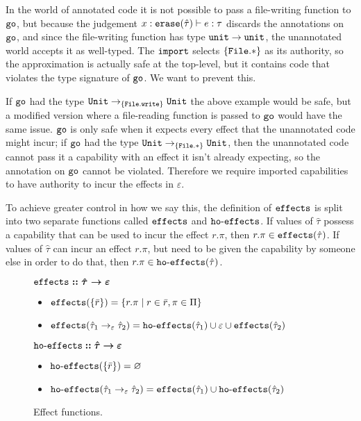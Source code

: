 In the world of annotated code it is not possible to pass a file-writing function to $\mathtt{go}$, but because the judgement $x: \mathtt{erase}(\hat \tau) \vdash e: \tau$ discards the annotations on $\mathtt{go}$, and since the file-writing function has type $\mathtt{unit} \rightarrow \mathtt{unit}$, the unannotated world accepts it as well-typed. The $\mathtt{import}$ selects $\{ \mathtt{File.*} \}$ as its authority, so the approximation is actually safe at the top-level, but it contains code that violates the type signature of $\mathtt{go}$. We want to prevent this.

If $\mathtt{go}$ had the type $\mathtt{Unit} \rightarrow_{\{ \mathtt{File.write} \}} \mathtt{Unit}$ the above example would be safe, but a modified version where a file-reading function is passed to $\mathtt{go}$ would have the same issue. $\mathtt{go}$ is only safe when it expects every effect that the unannotated code might incur; if $\mathtt{go}$ had the type $\mathtt{Unit} \rightarrow_{\{ \mathtt{File.*} \}} \mathtt{Unit}$, then the unannotated code cannot pass it a capability with an effect it isn't already expecting, so the annotation on $\mathtt{go}$ cannot be violated. Therefore we require imported capabilities to have authority to incur the effects in $\varepsilon$.

To achieve greater control in how we say this, the definition of $\mathtt{effects}$ is split into two separate functions called $\mathtt{effects}$ and $\mathtt{ho \hbox{-} effects}$. If values of $\hat \tau$ possess a capability that can be used to incur the effect $r.\pi$, then $r.\pi \in \mathtt{effects}(\hat \tau)$. If values of $\hat \tau$ can incur an effect $r.\pi$, but need to be given the capability by someone else in order to do that, then $r.\pi \in \mathtt{ho \hbox{-} effects}(\hat \tau)$.


\begin{figure}[h]

$\bm{\mathtt{effects :: \hat \tau \rightarrow \varepsilon}}$ \begin{itemize}
	\setlength\itemsep{-0.7em}
	\item[] $\mathtt{effects}(\{ \bar r \}) = \{ r.\pi \mid r \in \bar r, \pi \in \Pi \}$
	\item[] $\mathtt{effects}(\hat \tau_1 \rightarrow_{\varepsilon} \hat \tau_2) = \mathtt{ho \hbox{-} effects}(\hat \tau_1) \cup \varepsilon \cup \mathtt{effects}(\hat \tau_2)$
\end{itemize}

$\bm{\mathtt{ho \hbox{-} effects} :: \hat \tau \rightarrow \varepsilon}$ \begin{itemize}
	\setlength\itemsep{-0.7em}
	\item[] $\mathtt{ho \hbox{-} effects}(\{ \bar r \}) = \varnothing$
	\item[] $\mathtt{ho \hbox{-} effects}(\hat \tau_1 \rightarrow_{\varepsilon} \hat \tau_2) = \mathtt{effects}(\hat \tau_1) \cup \mathtt{ho \hbox{-} effects}(\hat \tau_2)$
\end{itemize}

\vspace{-7pt}
\caption{Effect functions.}
\label{fig:fx_defns}
\end{figure}


